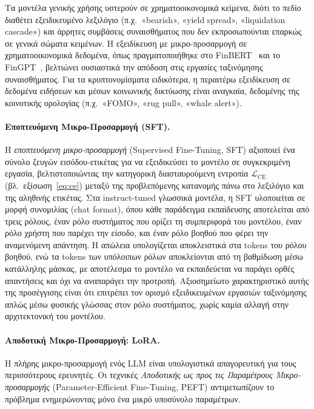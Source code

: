 Τα μοντέλα γενικής χρήσης υστερούν σε χρηματοοικονομικά κείμενα, διότι το
πεδίο διαθέτει εξειδικευμένο λεξιλόγιο (π.χ.\ «bearish», «yield spread»,
«liquidation cascade») και άρρητες συμβάσεις συναισθήματος που δεν
εκπροσωπούνται επαρκώς σε γενικά σώματα κειμένων. Η εξειδίκευση με
μικρο-προσαρμογή σε χρηματοοικονομικά δεδομένα, όπως πραγματοποιήθηκε στο
FinBERT~\cite{araci2019finbert} και το FinGPT~\cite{yang2023fingpt}, βελτιώνει
ουσιαστικά την απόδοση στις εργασίες ταξινόμησης συναισθήματος. Για τα
κρυπτονομίσματα ειδικότερα, η περαιτέρω εξειδίκευση σε δεδομένα ειδήσεων και
μέσων κοινωνικής δικτύωσης είναι αναγκαία, δεδομένης της κοινοτικής ορολογίας
(π.χ.\ «FOMO», «rug pull», «whale alert»).

\paragraph{Εποπτευόμενη Μικρο-Προσαρμογή (SFT).}
Η \emph{εποπτευόμενη μικρο-προσαρμογή} (Supervised Fine-Tuning, SFT) αξιοποιεί
ένα σύνολο ζευγών εισόδου-ετικέτας για να εξειδικεύσει το μοντέλο σε
συγκεκριμένη εργασία, βελτιστοποιώντας την κατηγορική διασταυρούμενη εντροπία
$\mathcal{L}_{\mathrm{CE}}$ (βλ.\ εξίσωση~\ref{eq:ce}) μεταξύ της προβλεπόμενης
κατανομής πάνω στο λεξιλόγιο και της αληθινής ετικέτας. Στα instruct-tuned
γλωσσικά μοντέλα, η SFT υλοποιείται σε μορφή συνομιλίας (chat format), όπου κάθε
παράδειγμα εκπαίδευσης αποτελείται από τρεις ρόλους, έναν ρόλο συστήματος
που ορίζει τη συμπεριφορά του μοντέλου, έναν ρόλο χρήστη που παρέχει την
είσοδο, και έναν ρόλο βοηθού που φέρει την αναμενόμενη απάντηση. Η απώλεια
υπολογίζεται αποκλειστικά στα tokens του ρόλου βοηθού, ενώ τα tokens των
υπόλοιπων ρόλων αποκλείονται από τη βαθμίδωση μέσω κατάλληλης μάσκας, με
αποτέλεσμα το μοντέλο να εκπαιδεύεται να παράγει ορθές απαντήσεις και όχι να
αναπαράγει την προτροπή. Αξιοσημείωτο χαρακτηριστικό αυτής της προσέγγισης
είναι ότι επιτρέπει τον ορισμό εξειδικευμένων εργασιών ταξινόμησης απλώς μέσω
φυσικής γλώσσας στον ρόλο συστήματος, χωρίς καμία αλλαγή στην αρχιτεκτονική
του μοντέλου.

\paragraph{Αποδοτική Μικρο-Προσαρμογή: LoRA.}
Η πλήρης μικρο-προσαρμογή ενός LLM είναι υπολογιστικά απαγορευτική για τους
περισσότερους ερευνητές. Οι τεχνικές \emph{Αποδοτικής ως προς τις Παραμέτρους
Μικρο-προσαρμογής} (Parameter-Efficient Fine-Tuning, PEFT) αντιμετωπίζουν το
πρόβλημα ενημερώνοντας μόνο ένα μικρό υποσύνολο παραμέτρων.

